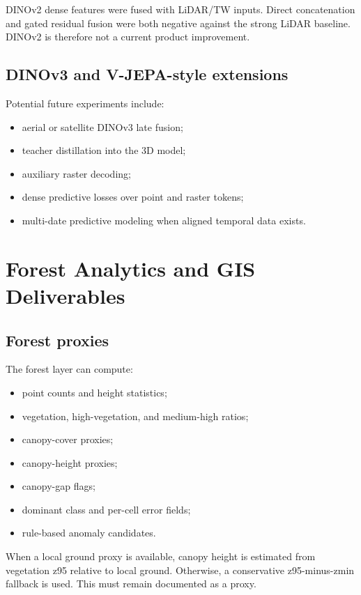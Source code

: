 \documentclass[11pt,a4paper]{article}
\begin{document}
DINOv2 dense features were fused with LiDAR/TW inputs. Direct concatenation and gated residual fusion were both negative against the strong LiDAR baseline. DINOv2 is therefore not a current product improvement.

\subsection{DINOv3 and V-JEPA-style extensions}

Potential future experiments include:

\begin{itemize}
  \item aerial or satellite DINOv3 late fusion;
  \item teacher distillation into the 3D model;
  \item auxiliary raster decoding;
  \item dense predictive losses over point and raster tokens;
  \item multi-date predictive modeling when aligned temporal data exists.
\end{itemize}

\section{Forest Analytics and GIS Deliverables}

\subsection{Forest proxies}

The forest layer can compute:

\begin{itemize}
  \item point counts and height statistics;
  \item vegetation, high-vegetation, and medium-high ratios;
  \item canopy-cover proxies;
  \item canopy-height proxies;
  \item canopy-gap flags;
  \item dominant class and per-cell error fields;
  \item rule-based anomaly candidates.
\end{itemize}

When a local ground proxy is available, canopy height is estimated from vegetation z95 relative to local ground. Otherwise, a conservative z95-minus-zmin fallback is used. This must remain documented as a proxy.
\end{document}

